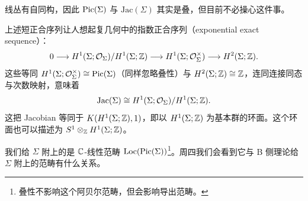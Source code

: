 \begin{remark}
  线丛有自同构，因此 $\operatorname{Pic}(\Sigma)$ 与 $\mathrm{Jac}(\Sigma)$ 其实是叠，但目前不必操心这件事。
\end{remark}

上述短正合序列让人想起复几何中的指数正合序列（exponential exact sequence）：
\[
  0 \longrightarrow H^1(\Sigma;\mathcal{O}_\Sigma)/H^1(\Sigma;\mathbb{Z}) \longrightarrow H^1(\Sigma;\mathcal{O}_\Sigma^\times) \longrightarrow H^2(\Sigma;\mathbb{Z}).
\]
这些等同 $H^1(\Sigma;\mathcal{O}_\Sigma^\times)\cong\operatorname{Pic}(\Sigma)$（同样忽略叠性）与 $H^2(\Sigma;\mathbb{Z})\cong\mathbb{Z}$，连同连接同态与次数映射，意味着
\[
  \mathrm{Jac}(\Sigma) \cong H^1(\Sigma;\mathcal{O}_\Sigma)/H^1(\Sigma;\mathbb{Z}).
\]
这把 Jacobian 等同于 $K(H^1(\Sigma;\mathbb{Z}),1)$，即以 $H^1(\Sigma;\mathbb{Z})$ 为基本群的环面。这个环面也可以描述为 $S^1\otimes_{\mathbb{Z}} H^1(\Sigma;\mathbb{Z})$。


我们给 $\Sigma$ 附上的是 $\mathbb{C}$-线性范畴 $\mathrm{Loc}(\operatorname{Pic}(\Sigma))$\footnote{叠性不影响这个阿贝尔范畴，但会影响导出范畴。}。周四我们会看到它与 B 侧理论给 $\Sigma$ 附上的范畴有什么关系。
